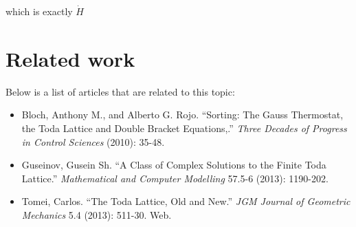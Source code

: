 which is exactly $\dot{H}$

\section{Related work}

Below is a list of articles that are related to this topic: 
\begin{itemize}

\item{
    Bloch, Anthony M., and Alberto G. Rojo. ``Sorting: The Gauss Thermostat, the Toda Lattice and Double Bracket Equations,.'' \textit{Three Decades of Progress in Control Sciences} (2010): 35-48. }
\item{
    Guseinov, Gusein Sh. ``A Class of Complex Solutions to the Finite Toda Lattice.'' \textit{Mathematical and Computer Modelling} 57.5-6 (2013): 1190-202.}
    
\item{
    Tomei, Carlos. ``The Toda Lattice, Old and New.'' \textit{JGM Journal of Geometric Mechanics} 5.4 (2013): 511-30. Web.}
\end{itemize}


% 
